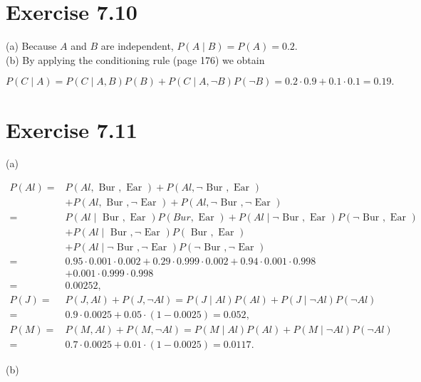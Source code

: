 \documentclass[10pt]{book}
\begin{document}
\section*{Exercise 7.10}
(a) Because $A$ and $B$ are independent, $P(A \mid B)=P(A)=0.2$.\\
(b) By applying the conditioning rule (page 176) we obtain

$$
P(C \mid A)=P(C \mid A, B) P(B)+P(C \mid A, \neg B) P(\neg B)=0.2 \cdot 0.9+0.1 \cdot 0.1=0.19 .
$$

\section*{Exercise 7.11}
(a)

$$
\begin{aligned}
P(A l)= & P(A l, \text { Bur }, \text { Ear })+P(A l, \neg \text { Bur }, \text { Ear }) \\
& +P(A l, \text { Bur }, \neg \text { Ear })+P(A l, \neg \text { Bur }, \neg \text { Ear }) \\
= & P(A l \mid \text { Bur }, \text { Ear }) P(B u r, \text { Ear })+P(A l \mid \neg \text { Bur }, \text { Ear }) P(\neg \text { Bur }, \text { Ear }) \\
& +P(A l \mid \text { Bur }, \neg \text { Ear }) P(\text { Bur }, \text { Ear }) \\
& +P(A l \mid \neg \text { Bur }, \neg \text { Ear }) P(\neg \text { Bur }, \neg \text { Ear }) \\
= & 0.95 \cdot 0.001 \cdot 0.002+0.29 \cdot 0.999 \cdot 0.002+0.94 \cdot 0.001 \cdot 0.998 \\
& +0.001 \cdot 0.999 \cdot 0.998 \\
= & 0.00252, \\
P(J)= & P(J, A l)+P(J, \neg A l)=P(J \mid A l) P(A l)+P(J \mid \neg A l) P(\neg A l) \\
= & 0.9 \cdot 0.0025+0.05 \cdot(1-0.0025)=0.052, \\
P(M)= & P(M, A l)+P(M, \neg A l)=P(M \mid A l) P(A l)+P(M \mid \neg A l) P(\neg A l) \\
= & 0.7 \cdot 0.0025+0.01 \cdot(1-0.0025)=0.0117 .
\end{aligned}
$$

(b)
\end{document}
